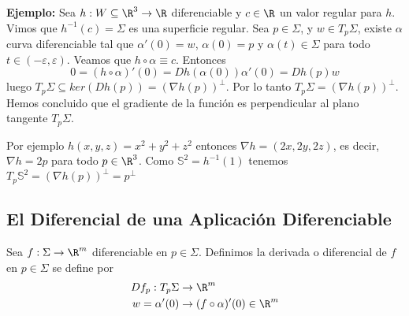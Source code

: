 \documentclass{article}
\begin{document}
\noindent\textbf{Ejemplo:} Sea $h:W\subseteq\R^{3}\to\R$ diferenciable y $c\in\R$ un valor regular
para $h$. Vimos que $h^{-1}(c)=\Sigma$ es una superficie regular. Sea $p\in\Sigma$, y 
$w\in T_{p}{\Sigma}$, existe $\alpha$ curva diferenciable tal que $\alpha'(0)=w$, $\alpha(0)=p$ y
$\alpha(t)\in\Sigma$ para todo $t\in(-\varepsilon, \varepsilon)$. Veamos que 
$h\circ\alpha\equiv c$. Entonces
\begin{equation*}
    0=(h\circ\alpha)'(0)=Dh(\alpha(0))\alpha'(0)=Dh(p)w
\end{equation*}
luego $T_{p}\Sigma\subseteq ker(Dh(p))=(\nabla h(p))^{\perp}$. Por lo tanto $T_{p}\Sigma=
(\nabla h(p))^{\perp}$. Hemos concluido que el gradiente de la función es perpendicular al plano 
tangente $T_{p}\Sigma$.
\vspace{4mm}

\noindent Por ejemplo $h(x,y,z)=x^{2}+y^{2}+z^{2}$ entonces $\nabla h=(2x,2y,2z)$, es decir, 
$\nabla h=2p$ para todo $p\in\R^{3}$. Como $\mathbb{S}^{2}=h^{-1}(1)$ tenemos 
$T_{p}\mathbb{S}^{2}=(\nabla h(p))^{\perp}=p^{\perp}$

\subsection{El Diferencial de una Aplicación Diferenciable}
\begin{dfn}
    Sea $f:\Sigma\to\R^{m}$ diferenciable en $p\in\Sigma$. Definimos la derivada o diferencial de
    $f$ en $p\in\Sigma$ se define por
    \begin{align*}
        Df_{p}:T_{p}\Sigma &\to \R^{m} \\
        w=\alpha'(0) &\to (f\circ\alpha)'(0)\in\R^{m}
    \end{align*}
\end{dfn}
\end{document}
